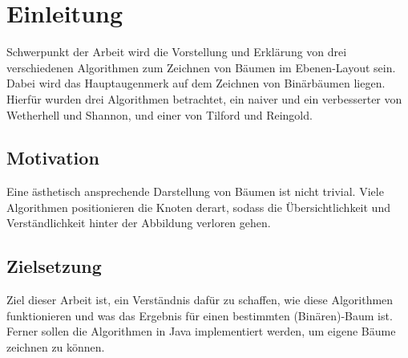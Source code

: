 \chapter{Einleitung}
\label{chap:einleitung}
Schwerpunkt der Arbeit wird die Vorstellung und Erklärung von drei verschiedenen Algorithmen zum
Zeichnen von Bäumen im Ebenen-Layout sein. Dabei wird das Hauptaugenmerk auf dem Zeichnen
von Binärbäumen liegen. Hierfür wurden drei Algorithmen betrachtet, ein naiver und ein verbesserter von
Wetherhell und Shannon, und einer von Tilford und Reingold.

\section{Motivation}
\label{sec:motivation}
Eine ästhetisch ansprechende Darstellung von Bäumen ist nicht trivial.
Viele Algorithmen positionieren die Knoten derart, sodass die Übersichtlichkeit
und Verständlichkeit hinter der Abbildung verloren gehen.

\section{Zielsetzung}
\label{sec:zielsetzung}
Ziel dieser Arbeit ist, ein Verständnis dafür zu schaffen, wie diese Algorithmen funktionieren
und was das Ergebnis für einen bestimmten (Binären)-Baum ist. Ferner sollen die
Algorithmen in Java implementiert werden, um eigene Bäume zeichnen zu können.
